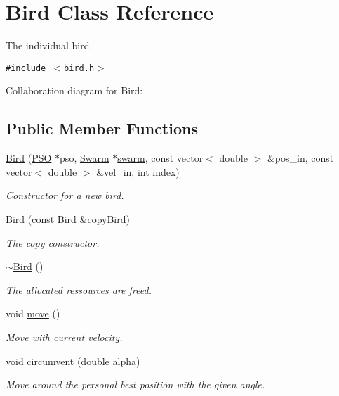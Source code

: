\hypertarget{classBird}{
\section{Bird Class Reference}
\label{classBird}
}
The individual bird.  


{\tt \#include $<$bird.h$>$}

Collaboration diagram for Bird:\subsection*{Public Member Functions}
\begin{CompactItemize}
\item 
\hyperlink{classBird_c609549ab3719aba052ee9fb1d647575}{Bird} (\hyperlink{classPSO}{PSO} $\ast$pso, \hyperlink{classSwarm}{Swarm} $\ast$\hyperlink{runpso_8cpp_d109228d8e9242dab1ff75e8dc3e6787}{swarm}, const vector$<$ double $>$ \&pos\_\-in, const vector$<$ double $>$ \&vel\_\-in, int \hyperlink{classBird_43bfb452fe35adad0d607b46fcd0d8cc}{index})
\begin{CompactList}\small\item\em Constructor for a new bird. \item\end{CompactList}\item 
\hyperlink{classBird_39d3ca069eaa6c0f686f4c00d10952ff}{Bird} (const \hyperlink{classBird}{Bird} \&copyBird)
\begin{CompactList}\small\item\em The copy constructor. \item\end{CompactList}\item 
\hyperlink{classBird_7d10693b91a2736611c37f1ef205b911}{$\sim$Bird} ()
\begin{CompactList}\small\item\em The allocated ressources are freed. \item\end{CompactList}\item 
void \hyperlink{classBird_927de56d5f04e630f71d5488e57ee7ac}{move} ()
\begin{CompactList}\small\item\em Move with current velocity. \item\end{CompactList}\item 
void \hyperlink{classBird_3834db8ea6e9f92188bfdef44c4ccdc2}{circumvent} (double alpha)
\begin{CompactList}\small\item\em Move around the personal best position with the given angle. \item\end{CompactList}\item 

\end{CompactItemize}
